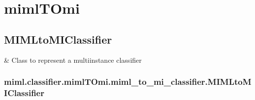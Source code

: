 \documentclass[letterpaper,10pt,english]{sphinxmanual}
\begin{document}
\sphinxstepscope


\section{mimlTOmi}
\label{\detokenize{classifier/mimlTOmi/index:mimltomi}}\label{\detokenize{classifier/mimlTOmi/index::doc}}
\sphinxstepscope


\subsection{MIMLtoMIClassifier}
\label{\detokenize{classifier/mimlTOmi/miml_to_mi_classifier:mimltomiclassifier}}\label{\detokenize{classifier/mimlTOmi/miml_to_mi_classifier::doc}}

\begin{savenotes}\sphinxattablestart
\sphinxthistablewithglobalstyle
\sphinxthistablewithnovlinesstyle
\centering
\begin{tabulary}{\linewidth}[t]{}
\sphinxtoprule
\sphinxtableatstartofbodyhook
\sphinxAtStartPar
{\hyperref[\detokenize{classifier/mimlTOmi/_autosummary/miml.classifier.mimlTOmi.miml_to_mi_classifier.MIMLtoMIClassifier:miml.classifier.mimlTOmi.miml_to_mi_classifier.MIMLtoMIClassifier}]{}}
&
\sphinxAtStartPar
Class to represent a multi\sphinxhyphen{}instance classifier
\\
\sphinxbottomrule
\end{tabulary}
\sphinxtableafterendhook\par
\sphinxattableend\end{savenotes}

\sphinxstepscope


\subsubsection{miml.classifier.mimlTOmi.miml\_to\_mi\_classifier.MIMLtoMIClassifier}
\label{\detokenize{classifier/mimlTOmi/_autosummary/miml.classifier.mimlTOmi.miml_to_mi_classifier.MIMLtoMIClassifier:miml-classifier-mimltomi-miml-to-mi-classifier-mimltomiclassifier}}\label{\detokenize{classifier/mimlTOmi/_autosummary/miml.classifier.mimlTOmi.miml_to_mi_classifier.MIMLtoMIClassifier::doc}}
\end{document}
